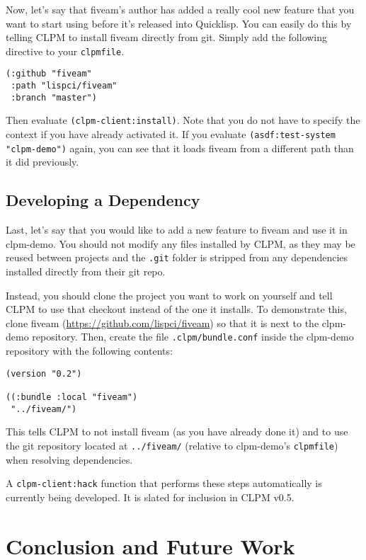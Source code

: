 \documentclass[format=sigconf]{acmart}
\begin{document}
Now, let's say that fiveam's author has added a really cool new feature that
you want to start using before it's released into Quicklisp. You can easily do
this by telling CLPM to install fiveam directly from git. Simply add the
following directive to your \verb|clpmfile|.

\begin{verbatim}
(:github "fiveam"
 :path "lispci/fiveam"
 :branch "master")
\end{verbatim}

Then evaluate \verb|(clpm-client:install)|. Note that you do not have to
specify the context if you have already activated it. If you evaluate
\verb|(asdf:test-system "clpm-demo")| again, you can see that it loads fiveam
from a different path than it did previously.

\subsection{Developing a Dependency}

Last, let's say that you would like to add a new feature to fiveam and use it
in clpm-demo. You should not modify any files installed by CLPM, as they may be
reused between projects and the \verb|.git| folder is stripped from any
dependencies installed directly from their git repo.

Instead, you should clone the project you want to work on yourself and tell
CLPM to use that checkout instead of the one it installs. To demonstrate this,
clone fiveam (\url{https://github.com/lispci/fiveam}) so that it is next to the
clpm-demo repository. Then, create the file \verb|.clpm/bundle.conf| inside the
clpm-demo repository with the following contents:

\begin{verbatim}
(version "0.2")

((:bundle :local "fiveam")
 "../fiveam/")
\end{verbatim}

This tells CLPM to not install fiveam (as you have already done it) and to use
the git repository located at \verb|../fiveam/| (relative to clpm-demo's
\verb|clpmfile|) when resolving dependencies.

A \verb|clpm-client:hack| function that performs these steps automatically is
currently being developed. It is slated for inclusion in CLPM v0.5.

\section{Conclusion and Future Work}
\end{document}
